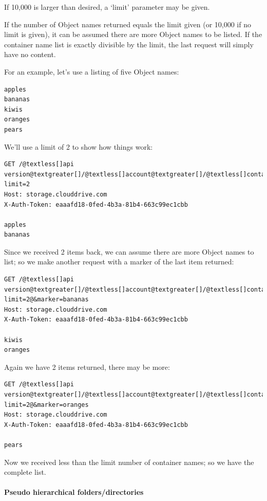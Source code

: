 \documentclass[letterpaper,10pt,english]{manual}
\begin{document}
If 10,000 is larger than desired, a `limit' parameter may be given.

If the number of Object names returned equals the limit given (or 10,000
if no limit is given), it can be assumed there are more Object names to be
listed. If the container name list is exactly divisible by the limit, the
last request will simply have no content.

For an example, let's use a listing of five Object names:

\begin{Verbatim}[commandchars=@\[\]]
apples
bananas
kiwis
oranges
pears
\end{Verbatim}

We'll use a limit of 2 to show how things work:

\begin{Verbatim}[commandchars=@\[\]]
GET /@textless[]api version@textgreater[]/@textless[]account@textgreater[]/@textless[]container@textgreater[]?limit=2
Host: storage.clouddrive.com
X-Auth-Token: eaaafd18-0fed-4b3a-81b4-663c99ec1cbb

apples
bananas
\end{Verbatim}

Since we received 2 items back, we can assume there are more Object names
to list; so we make another request with a marker of the last item
returned:

\begin{Verbatim}[commandchars=@\[\]]
GET /@textless[]api version@textgreater[]/@textless[]account@textgreater[]/@textless[]container@textgreater[]?limit=2@&marker=bananas
Host: storage.clouddrive.com
X-Auth-Token: eaaafd18-0fed-4b3a-81b4-663c99ec1cbb

kiwis
oranges
\end{Verbatim}

Again we have 2 items returned, there may be more:

\begin{Verbatim}[commandchars=@\[\]]
GET /@textless[]api version@textgreater[]/@textless[]account@textgreater[]/@textless[]container@textgreater[]?limit=2@&marker=oranges
Host: storage.clouddrive.com
X-Auth-Token: eaaafd18-0fed-4b3a-81b4-663c99ec1cbb

pears
\end{Verbatim}

Now we received less than the limit number of container names; so we have
the complete list.


\paragraph{Pseudo hierarchical folders/directories}
\end{document}
